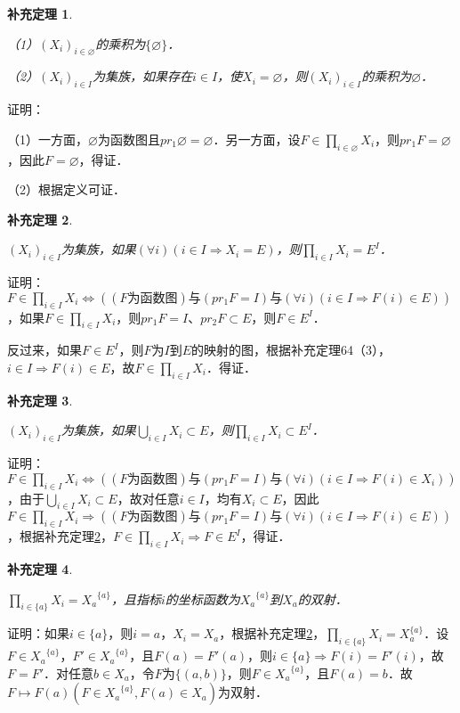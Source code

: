 \documentclass[12pt, a4paper, oneside]{book}
\newtheorem{cor}{补充定理}
\begin{document}
			\begin{cor}\label{cor127}
				\hfill\par
				（1）$(X_i)_{i\in \varnothing}$的乘积为$\{\varnothing\}$．
				\par
				（2）$(X_i)_{i\in I}$为集族，如果存在$i\in I$，使$X_i=\varnothing$，则$(X_i)_{i\in I}$的乘积为$\varnothing$．
			\end{cor}
			证明：
			\par
			（1）一方面，$\varnothing$为函数图且$pr_1\varnothing= \varnothing$．另一方面，设$F\in \prod\limits_{i\in \varnothing}X_i$，则$pr_1F= \varnothing$，因此$F=\varnothing$，得证．
			\par
			（2）根据定义可证．
			
			\begin{cor}\label{cor128}
				\hfill\par
				$(X_i)_{i\in I}$为集族，如果$(\forall i)(i\in I\Rightarrow X_i=E)$，则$\prod\limits_{i\in I}X_i=E^I$．
			\end{cor}
			证明：$F\in \prod\limits_{i\in I}X_i\Leftrightarrow ((F\text{为函数图})\text{与}(pr_1F= I)\text{与}(\forall i)(i\in I\Rightarrow F(i)\in E))$，如果$F\in \prod\limits_{i\in I}X_i$，则$ pr_1F= I$、$pr_2F\subset E$，则$F\in E^I$．
			\par
			反过来，如果$F\in E^I$，则$F$为$I$到$E$的映射的图，根据补充定理64（3），$i\in I\Rightarrow F(i)\in E$，故$F\in \prod\limits_{i\in I}X_i$．得证．
			
			\begin{cor}\label{cor129}
				\hfill\par
				$(X_i)_{i\in I}$为集族，如果$\bigcup\limits_{i\in I}X_i\subset E$，则$\prod\limits_{i\in I}X_i\subset E^I$．
			\end{cor}
			证明：$F\in \prod\limits_{i\in I}X_i\Leftrightarrow ((F\text{为函数图})\text{与}(pr_1F= I)\text{与}(\forall i)(i\in I\Rightarrow F(i)\in X_i))$，由于$\bigcup\limits_{i\in I}X_i\subset E$，故对任意$i\in I$，均有$X_i\subset E$，因此$F\in \prod\limits_{i\in I}X_i\Rightarrow ((F\text{为函数图})\text{与}(pr_1F= I)\text{与}(\forall i)(i\in I\Rightarrow F(i)\in E))$，根据补充定理\ref{cor128}，$F\in \prod\limits_{i\in I}X_i\Rightarrow F\in E^I$，得证．
			
			\begin{cor}\label{cor130}
				\hfill\par
				$\prod\limits_{i\in \{a\}}X_i={X_a}^{\{a\}}$，且指标$i$的坐标函数为${X_a}^{\{a\}}$到$X_a$的双射．
			\end{cor}
			证明：如果$i\in \{a\}$，则$i=a$，$X_i=X_a$，根据补充定理\ref{cor128}，$\prod\limits_{i\in \{a\}}X_i=X_a^{\{a\}}$．设$F\in {X_a}^{\{a\}}$，$F' \in {X_a}^{\{a\}}$，且$F(a)=F'(a)$，则$i\in \{a\}\Rightarrow F(i)=F'(i)$，故$F=F'$．对任意$b\in X_a$，令$F$为$\{(a, b)\}$，则$F\in {X_a}^{\{a\}}$，且$F(a)=b$．故$F\mapsto F(a)(F\in {X_a}^{\{a\}}, F(a)\in X_a)$为双射．			
\end{document}
